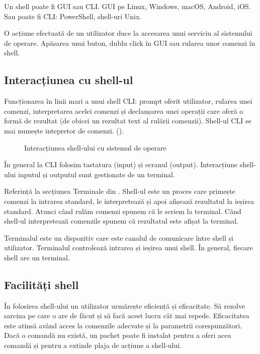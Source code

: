 Un shell poate fi GUI sau CLI. GUI pe Linux, Windows, macOS, Android, iOS. Sau
poate fi CLI: PowerShell, shell-uri Unix.

O acțiune efectuată de un utilizator duce la accesarea unui serviciu al
sistemului de operare. Apăsarea unui buton, dublu click în GUI sau rularea unor
comenzi în shell.

\subsection{Interacțiunea cu shell-ul}
\label{sec:cli-shell-interact}

Funcționarea în linii mari a unui shell CLI: prompt oferit utilizator, rularea
unei comenzi, interpretarea acelei comenzi și declanșarea unei operații care
oferă o formă de rezultat (de obicei un rezultat text al rulării comenzii).
Shell-ul CLI se mai numește intepretor de comenzi. ().

\begin{figure}[htbp]
  \centering
  \def\svgwidth{\columnwidth}
  
  \caption{Interacțiunea shell-ului cu sistemul de operare}
  \label{fig:cli:shell-os-interact}
\end{figure}

În general la CLI folosim tastatura (input) și ecranul (output). Interacțiune
shell-ului inputul și outputul sunt gestionate de un terminal.

Referință la secțiunea Terminale din .
Shell-ul este un proces care primește comenzi la intrarea standard, le
interpretează și apoi afișează rezultatul la ieșirea standard. Atunci când rulăm
comenzi spunem că le scriem la terminal. Când shell-ul interpretează comenzile
spunem că rezultatul este afișat la terminal.

Terminalul este un dispozitiv care este canalul de comunicare între shell și
utilizator. Terminalul controlează intrarea și ieșirea unui shell. În general,
fiecare shell are un terminal.

\subsection{Facilități shell}
\label{sec:cli-shell-characteristics}

În folosirea shell-ului un utilizator urmărește eficiență și eficacitate. Să
rezolve sarcina pe care o are de făcut și să facă acest lucru cât mai repede.
Eficacitatea este atinsă având acces la comenzile adecvate și la parametrii
corespunzători. Dacă o comandă nu există, un pachet poate fi instalat pentru a
oferi acea comandă și pentru a extinde plaja de acțiune a shell-ului.

